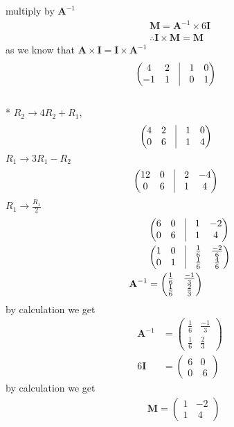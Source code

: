 \documentclass[journal,12pt,twocolumn]{IEEEtran}
\let\vec\mathbf
\newcommand{\myvec}[1]{\ensuremath{\begin{pmatrix}#1\end{pmatrix}}}
\begin{document}
\centering multiply by $ \vec{A}^{-1}$
\begin{align}
  \vec{M}=\vec{A}^{-1}\times 6\vec{I} \\  \therefore \vec{I}\times\vec{M}=\vec{M}
\end{align}
as we know that  $\vec{A} \times \vec{I}=\vec{I}\times \vec{A}^{-1}$
\begin{align}
   & \myvec{4 & 2 & \vrule & 1 & 0 \\ -1&1&\vrule&0&1}
\end{align}\\*
$R_2\rightarrow 4R_2+R_1$,
\begin{align}
   & \myvec{4 & 2 & \vrule & 1 & 0 \\ 0&6&\vrule&1&4}
\end{align}
$R_1\rightarrow 3R_1-R_2$
\begin{align}
   & \myvec{12 & 0 & \vrule & 2 & -4 \\0&6&\vrule&1&4}
\end{align}
$R_1\rightarrow \frac{R_1}{2}$
\begin{align}
               & \myvec{6     & 0 & \vrule & 1           & -2           \\ 0&6&\vrule&1&4}\\
               & \myvec{1     & 0 & \vrule & \frac{1}{6} & \frac{-2}{6} \\ 0&1&\vrule&\frac{1}{6}&\frac{4}{6}}\\
  \vec{A}^{-1} & =\myvec{
  \frac{1}{6}  & \frac{-1}{3}                                           \\
  \frac{1}{6}  & \frac{2}{3}
  }
\end{align}
by calculation we get
\begin{align}
  \vec{A}^{-1} & =\myvec{
  \frac{1}{6}  & \frac{-1}{3} \\
  \frac{1}{6}  & \frac{2}{3}
  }                           \\
  6\vec{I}     & =\myvec{
  6            & 0            \\
  0            & \ 6
  }
\end{align}
by calculation we get
\begin{align}
    & \vec{M}=\myvec{
  1 & -2              \\
  1 & \ 4
  }
\end{align}
\end{document}
